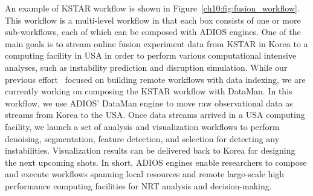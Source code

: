 \documentclass[x11names,table,xcdraw,graybox]{svmult}
\begin{document}
An example of KSTAR workflow is shown in Figure~\ref{ch10:fig:fusion_workflow}. This workflow is a multi-level workflow in that each box consists of one or more sub-workflows, each of which can be composed with ADIOS engines. One of the main goals is to stream online fusion experiment data from KSTAR in Korea to a computing facility in USA in order to perform various computational intensive analyses, such as instability prediction and disruption simulation.
While our previous effort~\cite{choi2013icee} focused on building remote workflows with data indexing, we are currently working on composing the KSTAR workflow with DataMan. In this workflow, we use ADIOS' DataMan engine to move raw observational data as streams from Korea to the USA. Once data streams arrived in a USA computing facility, we launch a set of analysis and visualization workflows to perform denoising, segmentation, feature detection, and selection for detecting any instabilities.
Visualization results can be delivered back to Korea for designing the next upcoming shots.
In short, ADIOS engines enable researchers to compose and execute workflows spanning local resources and remote large-scale high performance computing facilities for NRT analysis and decision-making.


\end{document}

